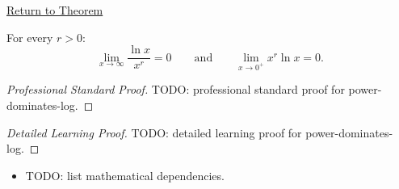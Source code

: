 \newpage
{}
\label{prf:power-dominates-log}

\begin{remark*}[Return]
\hyperref[prop:power-dominates-log]{Return to Theorem}
\end{remark*}

\begin{proposition*}
For every $r > 0$:
\[
  \lim_{x \to \infty} \frac{\ln x}{x^r} = 0
  \qquad\text{and}\qquad
  \lim_{x \to 0^+} x^r \ln x = 0.
\]

\smallskip\noindent
\end{proposition*}

\begin{proof}[Professional Standard Proof]
\LRAProofBodyStart
TODO: professional standard proof for power-dominates-log.
\end{proof}

\begin{proof}[Detailed Learning Proof]
\LRAProofBodyStart
TODO: detailed learning proof for power-dominates-log.
\end{proof}

\begin{remark*}
\end{remark*}

\begin{dependencies}
\begin{itemize}
  \item TODO: list mathematical dependencies.
\end{itemize}
\end{dependencies}

\clearpage
